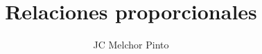 \documentclass[12pt,addpoints,answers]{guia}
\title{Relaciones proporcionales}
\author{JC Melchor Pinto}
\begin{document}
\pagestyle{headandfoot}

\INFO
\printanswers

\begin{questions}
    \questionboxed[50] 
    \questionboxed[50] 
\end{questions}

\end{document}
